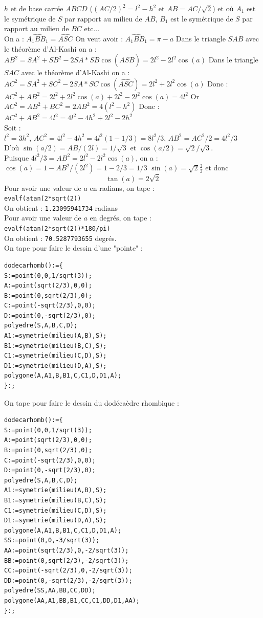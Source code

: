 \documentclass[a4paper,11pt]{book}
\begin{document}
$h$ et de base carr\'ee $ABCD$ ($(AC/2)^2=l^2-h^2$ et $AB=AC/\sqrt 2$) et 
o\`u $A_1$ est le sym\'etrique de $S$ par rapport au 
milieu de $AB$, $B_1$ est le sym\'etrique de $S$ par rapport au 
milieu de  $BC$ etc...\\
On a :  $\widehat{A_1BB_1}=\widehat{ASC}$
On veut avoir : $\widehat{A_1BB_1}=\pi-a$
Dans le triangle $SAB$ avec le th\'eor\`eme d'Al-Kashi on a :\\
$AB^2=SA^2+SB^2-2SA*SB\cos(\widehat{ASB})=2l^2-2l^2\cos(a)$
Dans le triangle $SAC$ avec le th\'eor\`eme d'Al-Kashi on a :\\
$AC^2=SA^2+SC^2-2SA*SC\cos(\widehat{ASC})=2l^2+2l^2\cos(a)$
Donc :\\
$AC^2+AB^2=2l^2+2l^2\cos(a)+2l^2-2l^2\cos(a)=4l^2$
Or $AC^2=AB^2+BC^2=2AB^2=4(l^2-h^2)$
Donc :\\
$AC^2+AB^2=4l^2=4l^2-4h^2+2l^2-2h^2$\\
Soit :\\
$l^2=3h^2$, $AC^2=4l^2-4h^2=4l^2(1-1/3)=8l^2/3$, $AB^2=AC^2/2=4l^2/3$\\
D'o\`u $\sin(a/2)=AB/(2l)=1/\sqrt 3$ et $\cos(a/2)=\sqrt 2/\sqrt 3$.\\
Puisque $4l^2/3=AB^2=2l^2-2l^2\cos(a)$, on a :\\
$\cos(a)=1-AB^2/(2l^2)=1-2/3=1/3$ $\sin(a)=\sqrt 2\frac{2}{3}$ et donc
$$\tan(a)=2\sqrt 2$$
Pour avoir une valeur de $a$ en radians, on tape :\\
{\tt evalf(atan(2*sqrt(2))}\\
On obtient : {\tt 1.23095941734} radians\\
Pour avoir une valeur de $a$ en degr\'es, on tape :\\
{\tt evalf(atan(2*sqrt(2))*180/pi)}\\
On obtient : {\tt 70.5287793655} degr\'es.\\
On tape pour faire le dessin d'une "pointe" :
\begin{verbatim}
dodecarhomb():={
S:=point(0,0,1/sqrt(3));
A:=point(sqrt(2/3),0,0);
B:=point(0,sqrt(2/3),0);
C:=point(-sqrt(2/3),0,0);
D:=point(0,-sqrt(2/3),0);
polyedre(S,A,B,C,D);
A1:=symetrie(milieu(A,B),S);
B1:=symetrie(milieu(B,C),S);
C1:=symetrie(milieu(C,D),S);
D1:=symetrie(milieu(D,A),S);
polygone(A,A1,B,B1,C,C1,D,D1,A);
}:;
\end{verbatim}
On tape pour faire le dessin du dod\'eca\`edre rhombique :
\begin{verbatim}
dodecarhomb():={
S:=point(0,0,1/sqrt(3));
A:=point(sqrt(2/3),0,0);
B:=point(0,sqrt(2/3),0);
C:=point(-sqrt(2/3),0,0);
D:=point(0,-sqrt(2/3),0);
polyedre(S,A,B,C,D);
A1:=symetrie(milieu(A,B),S);
B1:=symetrie(milieu(B,C),S);
C1:=symetrie(milieu(C,D),S);
D1:=symetrie(milieu(D,A),S);
polygone(A,A1,B,B1,C,C1,D,D1,A);
SS:=point(0,0,-3/sqrt(3));
AA:=point(sqrt(2/3),0,-2/sqrt(3));
BB:=point(0,sqrt(2/3),-2/sqrt(3));
CC:=point(-sqrt(2/3),0,-2/sqrt(3));
DD:=point(0,-sqrt(2/3),-2/sqrt(3));
polyedre(SS,AA,BB,CC,DD);
polygone(AA,A1,BB,B1,CC,C1,DD,D1,AA);
}:;
\end{verbatim}
\end{document}
